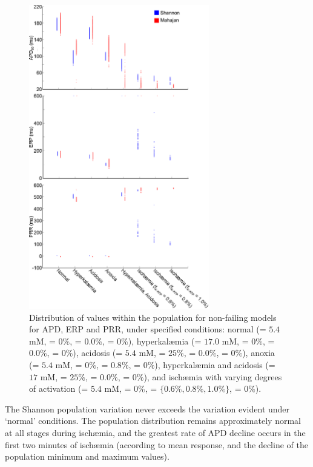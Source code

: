 \documentclass[../thesis-main.tex]{subfiles}
\begin{document}
\begin{figure}
 \centering
 \includegraphics[width=0.7\textwidth]{discretePopulation}
 \caption[Distribution of biomarker values under specified conditions.]{Distribution of values within the population for non-failing models for APD, ERP and PRR, under specified conditions: normal (\ko = $5.4$ mM, \finhib{} = $0\%$, \fkatp{} = $0.0\%$, \fna{} = $0\%$), hyperkal\ae{}mia (\ko = $17.0$ mM, \finhib{} = $0\%$, \fkatp{} = $0.0\%$, \fna{} = $0\%$), acidosis (\ko = $5.4$ mM, \finhib{} = $25\%$, \fkatp{} = $0.0\%$, \fna{} = $0\%$), anoxia (\ko = $5.4$ mM, \finhib{} = $0\%$, \fkatp{} = $0.8\%$, \fna{} = $0\%$), hyperkal\ae{}mia and acidosis (\ko = $17$ mM, \finhib{} = $25\%$, \fkatp{} = $0.0\%$, \fna{} = $0\%$), and isch\ae{}mia with varying degrees of \fkatp{} activation (\ko = $5.4$ mM, \finhib{} = $0\%$, \fkatp{} = $\{0.6\%, 0.8\%, 1.0\%\}$, \fna{} = $0\%$).}
 \label{fig:discretePopulation}
\end{figure}

The Shannon population variation never exceeds the variation evident under `normal' conditions. The population distribution remains approximately normal at all stages during isch\ae{}mia, and the greatest rate of APD decline occurs in the first two minutes of isch\ae{}mia (according to mean response, and the decline of the population minimum and maximum values).
\end{document}
